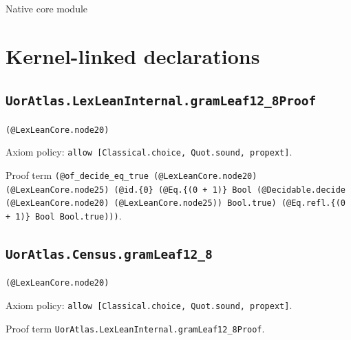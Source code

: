 \documentclass[11pt]{article}
\begin{document}
\begin{center}{\LARGE Native core module}\end{center}
\section*{Kernel-linked declarations}
\subsection*{\texttt{UorAtlas.LexLeanInternal.gramLeaf12\_8Proof}}
\noindent\texttt{(@LexLeanCore.node20)}\par
\noindent Axiom policy: \texttt{allow [Classical.choice, Quot.sound, propext]}.\par
\noindent Proof term \texttt{(@of\_decide\_eq\_true (@LexLeanCore.node20) (@LexLeanCore.node25) (@id.\{0\} (@Eq.\{(0 + 1)\} Bool (@Decidable.decide (@LexLeanCore.node20) (@LexLeanCore.node25)) Bool.true) (@Eq.refl.\{(0 + 1)\} Bool Bool.true)))}.\par
\subsection*{\texttt{UorAtlas.Census.gramLeaf12\_8}}
\noindent\texttt{(@LexLeanCore.node20)}\par
\noindent Axiom policy: \texttt{allow [Classical.choice, Quot.sound, propext]}.\par
\noindent Proof term \texttt{UorAtlas.LexLeanInternal.gramLeaf12\_8Proof}.\par
\end{document}
